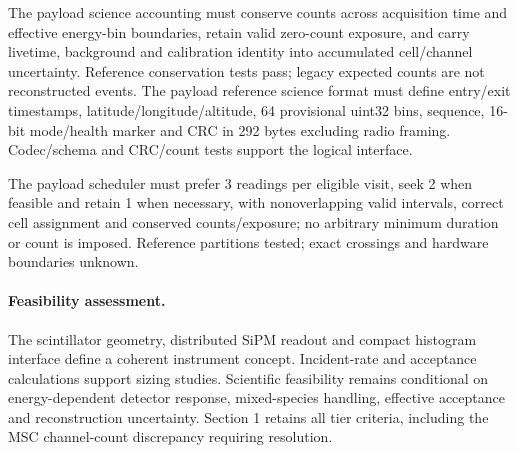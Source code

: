 The payload science accounting must conserve counts across acquisition time and effective energy-bin boundaries, retain valid zero-count exposure, and carry livetime, background and calibration identity into accumulated cell/channel uncertainty. Reference conservation tests pass; legacy expected counts are not reconstructed events.
The payload reference science format must define entry/exit timestamps, latitude/longitude/altitude, 64 provisional uint32 bins, sequence, 16-bit mode/health marker and CRC in 292 bytes excluding radio framing. Codec/schema and CRC/count tests support the logical interface.

The payload scheduler must prefer 3 readings per eligible visit, seek 2 when feasible and retain 1 when necessary, with nonoverlapping valid intervals, correct cell assignment and conserved counts/exposure; no arbitrary minimum duration or count is imposed. Reference partitions tested; exact crossings and hardware boundaries unknown.

\paragraph{Feasibility assessment.} The scintillator geometry, distributed SiPM readout and compact histogram interface define a coherent instrument concept. Incident-rate and acceptance calculations support sizing studies. Scientific feasibility remains conditional on energy-dependent detector response, mixed-species handling, effective acceptance and reconstruction uncertainty. Section 1 retains all tier criteria, including the MSC channel-count discrepancy requiring resolution.
